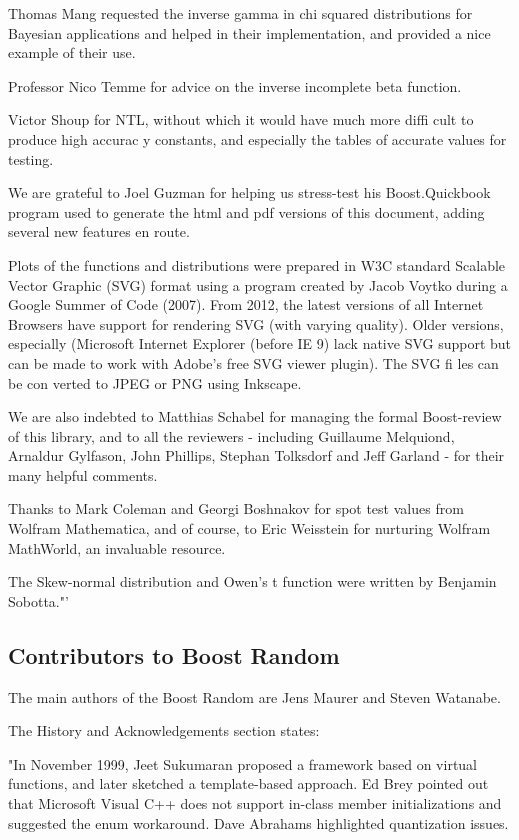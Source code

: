 \vpara
Thomas Mang requested the inverse gamma in chi squared distributions for Bayesian applications and helped in their implementation, and provided a nice example of their use.

\vpara
Professor Nico Temme for advice on the inverse incomplete beta function.

\vpara
Victor Shoup for NTL, without which it would have much more diffi cult to produce high accurac y constants, and especially the tables of accurate values for testing.

\vpara
We are grateful to Joel Guzman for helping us stress-test his Boost.Quickbook program used to generate the html and pdf versions of this document, adding several new features en route.

\vpara
Plots of the functions and distributions were prepared in W3C standard Scalable Vector Graphic (SVG) format using a program created by Jacob Voytko during a Google Summer of Code (2007). From 2012, the latest versions of all Internet Browsers have support for rendering SVG (with varying quality). Older versions, especially (Microsoft Internet Explorer (before IE 9) lack native SVG support but can be made to work with Adobe's free SVG viewer plugin). The SVG fi les can be con verted to JPEG or PNG using Inkscape.

\vpara
We are also indebted to Matthias Schabel for managing the formal Boost-review of this library, and to all the reviewers - including Guillaume Melquiond, Arnaldur Gylfason, John Phillips, Stephan Tolksdorf and Jeff Garland - for their many helpful comments.

\vpara
Thanks to Mark Coleman and Georgi Boshnakov for spot test values from Wolfram Mathematica, and of course, to Eric Weisstein for nurturing Wolfram MathWorld, an invaluable resource.

\vpara
The Skew-normal distribution and Owen's t function were written by Benjamin Sobotta."'




\subsection{Contributors to Boost Random}
\label{Contributors to Boost Random}
The main authors of the Boost Random are Jens Maurer and Steven Watanabe.

\vpara
The History and Acknowledgements section states:

\vpara
"In November 1999, Jeet Sukumaran proposed a framework based on virtual functions, and later sketched a template-based approach. Ed Brey pointed out that Microsoft Visual C++ does not support in-class member initializations and suggested the enum workaround. Dave Abrahams highlighted quantization issues. 

